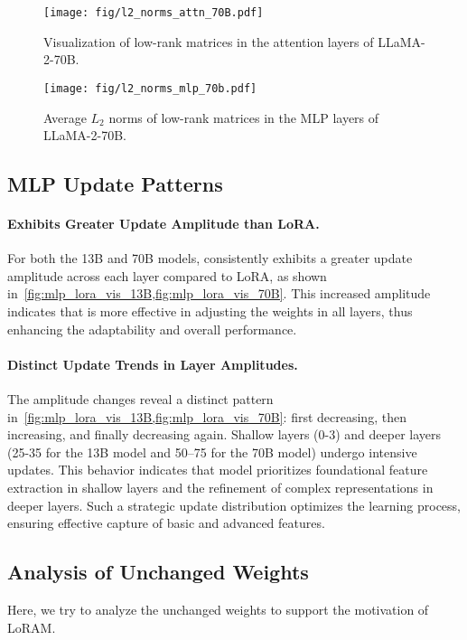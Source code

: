 \begin{figure*}[!t]
\begin{center}
\texttt{[image: fig/l2\_norms\_attn\_70B.pdf]}
    \caption{Visualization of low-rank matrices in the attention layers of LLaMA-2-70B.}
    \label{fig:attn_lora_vis_70B}
\texttt{[image: fig/l2\_norms\_mlp\_70b.pdf]}
    \caption{Average \(L_{2}\) norms of low-rank matrices in the MLP layers of LLaMA-2-70B.}
    \label{fig:mlp_lora_vis_70B}
\end{center}
\end{figure*}

\subsection{MLP Update Patterns}

\paragraph{\method Exhibits Greater Update Amplitude than LoRA.} For both the 13B and 70B models, \method consistently exhibits a greater update amplitude across each layer compared to LoRA, as shown in~\cref{fig:mlp_lora_vis_13B,fig:mlp_lora_vis_70B}. This increased amplitude indicates that \method is more effective in adjusting the weights in all layers, thus enhancing the adaptability and overall performance.
\paragraph{Distinct Update Trends in Layer Amplitudes.} The amplitude changes reveal a distinct pattern in~\cref{fig:mlp_lora_vis_13B,fig:mlp_lora_vis_70B}: first decreasing, then increasing, and finally decreasing again. Shallow layers (0-3) and deeper layers (25-35 for the 13B model and 50–75 for the 70B model) undergo intensive updates. This behavior indicates that model prioritizes foundational feature extraction in shallow layers and the refinement of complex representations in deeper layers. Such a strategic update distribution optimizes the learning process, ensuring effective capture of basic and advanced features.

\subsection{Analysis of Unchanged Weights}
Here, we try to analyze the unchanged weights to support the motivation of LoRAM.
